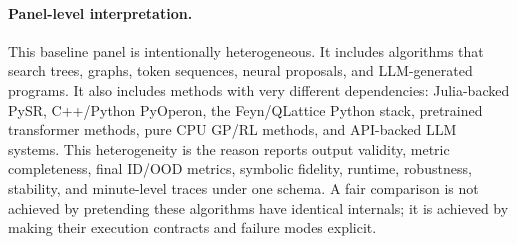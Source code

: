 \paragraph{Panel-level interpretation.}
This baseline panel is intentionally heterogeneous. It includes algorithms that search trees, graphs, token sequences, neural proposals, and LLM-generated programs. It also includes methods with very different dependencies: Julia-backed PySR, C++/Python PyOperon, the Feyn/QLattice Python stack, pretrained transformer methods, pure CPU GP/RL methods, and API-backed LLM systems. This heterogeneity is the reason \arena{} reports output validity, metric completeness, final ID/OOD metrics, symbolic fidelity, runtime, robustness, stability, and minute-level traces under one schema. A fair comparison is not achieved by pretending these algorithms have identical internals; it is achieved by making their execution contracts and failure modes explicit.
